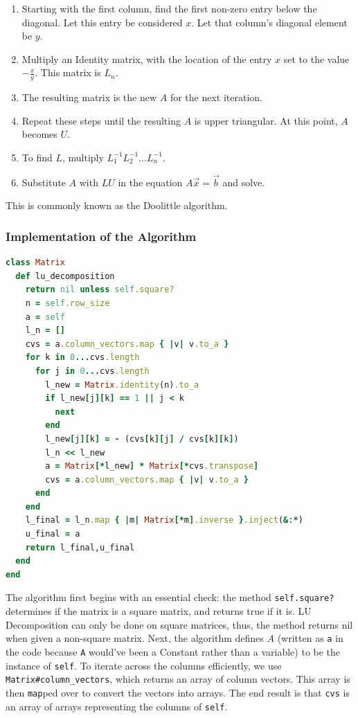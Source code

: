 \documentclass[letterpaper,12pt]{article}
\begin{document}
\begin{enumerate}
\item Starting with the first column, find the first non-zero entry below the
  diagonal. Let this entry be considered $x$. Let that column's diagonal element
  be $y$.
\item Multiply an Identity matrix, with the location of the entry $x$ set to the
  value $-\frac{x}{y}$. This matrix is $L_n$.
\item The resulting matrix is the new $A$ for the next iteration.
\item Repeat these steps until the resulting $A$ is upper triangular.
  At this point, $A$ becomes $U$.
\item To find $L$, multiply $L_1^{-1}L_2^{-1} ... L_n^{-1}$.
\item Substitute $A$ with $LU$ in the equation $A\vec{x}=\vec{b}$ and solve.
\end{enumerate}

This is commonly known as the Doolittle algorithm.

\subsubsection{Implementation of the Algorithm}

\lstset{caption=LU Decomposition}
\begin{lstlisting}[language=ruby]
class Matrix
  def lu_decomposition
    return nil unless self.square?
    n = self.row_size
    a = self
    l_n = []
    cvs = a.column_vectors.map { |v| v.to_a }
    for k in 0...cvs.length
      for j in 0...cvs.length
        l_new = Matrix.identity(n).to_a
        if l_new[j][k] == 1 || j < k
          next
        end
        l_new[j][k] = - (cvs[k][j] / cvs[k][k])
        l_n << l_new
        a = Matrix[*l_new] * Matrix[*cvs.transpose]
        cvs = a.column_vectors.map { |v| v.to_a }
      end
    end
    l_final = l_n.map { |m| Matrix[*m].inverse }.inject(&:*)
    u_final = a
    return l_final,u_final
  end
end
\end{lstlisting}

The algorithm first begins with an essential check: the method
\texttt{self.square?} determines if the matrix is a square matrix, and returns
true if it is.
LU Decomposition can only be done on square matrices, thus, the method returns
nil when given a non-square matrix.
Next, the algorithm defines $A$ (written as \texttt{a} in the code because
\texttt{A} would've been a Constant rather than a variable) to be the instance
of \texttt{self}.
To iterate across the columns efficiently, we use
\texttt{Matrix\#column\_vectors}, which returns an array of column vectors.
This array is then \texttt{map}ped over to convert the vectors into arrays.
The end result is that \texttt{cvs} is an array of arrays representing the
columns of \texttt{self}.
\end{document}
